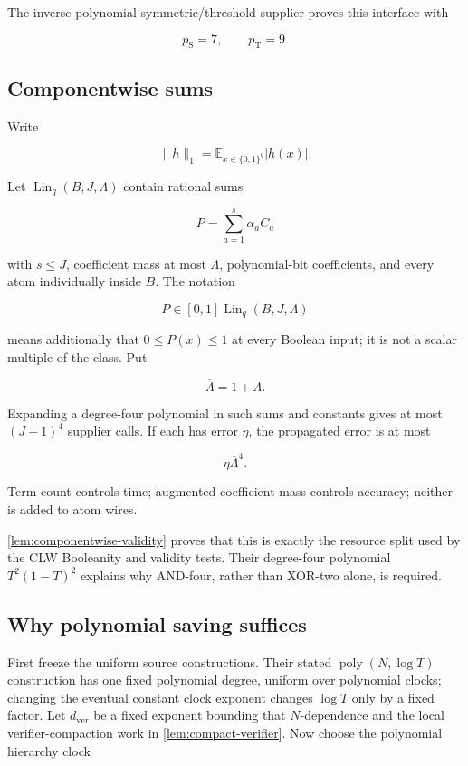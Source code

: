 \documentclass[11pt,letterpaper]{article}
\newcommand{\cref}[1]{\ref{#1}}
\theoremstyle{definition}
\theoremstyle{remark}
\begin{document}
The inverse-polynomial symmetric/threshold supplier proves this
interface with

\[
p_{\mathrm S}=7,
\qquad
p_{\mathrm T}=9.
\]

\subsection{Componentwise sums}\label{c2-componentwise-sums}

Write

\[
\lVert h\rVert_1
{}={}
\mathbb E_{x\in\{0,1\}^q}|h(x)|.
\]

Let \(\operatorname{Lin}_q(B,J,\Lambda)\) contain rational sums

\[
P=\sum_{a=1}^s\alpha_aC_a
\]

with \(s\le J\), coefficient mass at most \(\Lambda\), polynomial-bit
coefficients, and every atom individually inside \(B\). The notation

\[
P\in[0,1]\operatorname{Lin}_q(B,J,\Lambda)
\]

means additionally that \(0\le P(x)\le1\) at every Boolean input; it is
not a scalar multiple of the class. Put

\[
\overline\Lambda=1+\Lambda.
\]

Expanding a degree-four polynomial in such sums and constants gives at
most \((J+1)^4\) supplier calls. If each has error \(\eta\), the
propagated error is at most

\[
\eta\overline\Lambda^4.
\]

Term count controls time; augmented coefficient mass controls accuracy;
neither is added to atom wires.

\cref{lem:componentwise-validity} proves that this is exactly the resource split used by the
CLW Booleanity and validity tests. Their degree-four polynomial
\(T^2(1-T)^2\) explains why AND-four, rather than XOR-two alone, is
required.

\subsection{Why polynomial saving
suffices}\label{c3-why-polynomial-saving-suffices}

First freeze the uniform source constructions. Their stated
\(\operatorname{poly}(N,\log T)\) construction has one fixed polynomial
degree, uniform over polynomial clocks; changing the eventual constant
clock exponent changes \(\log T\) only by a fixed factor. Let
\(d_{\mathrm{ver}}\) be a fixed exponent bounding that \(N\)-dependence
and the local verifier-compaction work in \cref{lem:compact-verifier}. Now choose the
polynomial hierarchy clock
\end{document}
